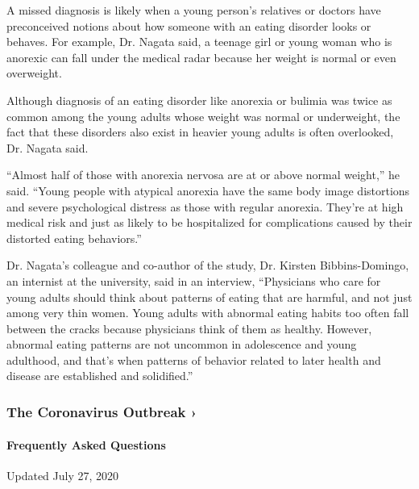 A missed diagnosis is likely when a young person's relatives or doctors
have preconceived notions about how someone with an eating disorder
looks or behaves. For example, Dr. Nagata said, a teenage girl or young
woman who is anorexic can fall under the medical radar because her
weight is normal or even overweight.

Although diagnosis of an eating disorder like anorexia or bulimia was
twice as common among the young adults whose weight was normal or
underweight, the fact that these disorders also exist in heavier young
adults is often overlooked, Dr. Nagata said.

``Almost half of those with anorexia nervosa are at or above normal
weight,'' he said. ``Young people with atypical anorexia have the same
body image distortions and severe psychological distress as those with
regular anorexia. They're at high medical risk and just as likely to be
hospitalized for complications caused by their distorted eating
behaviors.''

Dr. Nagata's colleague and co-author of the study, Dr. Kirsten
Bibbins-Domingo, an internist at the university, said in an interview,
``Physicians who care for young adults should think about patterns of
eating that are harmful, and not just among very thin women. Young
adults with abnormal eating habits too often fall between the cracks
because physicians think of them as healthy. However, abnormal eating
patterns are not uncommon in adolescence and young adulthood, and that's
when patterns of behavior related to later health and disease are
established and solidified.''

\href{https://www.nytimes.com/news-event/coronavirus?action=click\&pgtype=Article\&state=default\&region=MAIN_CONTENT_3\&context=storylines_faq}{}

\hypertarget{the-coronavirus-outbreak-}{%
\subsubsection{The Coronavirus Outbreak
›}\label{the-coronavirus-outbreak-}}

\hypertarget{frequently-asked-questions}{%
\paragraph{Frequently Asked
Questions}\label{frequently-asked-questions}}

Updated July 27, 2020

